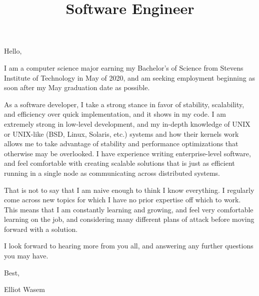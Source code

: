 \documentclass[12pt,letterpaper,roman]{moderncv}
\title{Software Engineer}
\begin{document}
\maketitle{}

\sethintscolumntowidth{\ }
Hello,\bigskip

I am a computer science major earning my Bachelor's of Science from Stevens Institute of Technology in May of 2020, and am seeking employment beginning as soon after my May graduation date as possible.\bigskip

As a software developer, I take a strong stance in favor of stability, scalability, and efficiency over quick implementation, and it shows in my code. I am extremely strong in low-level development, and my in-depth knowledge of UNIX or UNIX-like (BSD, Linux, Solaris, etc.) systems and how their kernels work allows me to take advantage of stability and performance optimizations that otherwise may be overlooked. I have experience writing enterprise-level software, and feel comfortable with creating scalable solutions that is just as efficient running in a single node as communicating across distributed systems.\bigskip

That is not to say that I am naive enough to think I know everything. I regularly come across new topics for which I have no prior expertise off which to work. This means that I am constantly learning and growing, and feel very comfortable learning on the job, and considering many different plans of attack before moving forward with a solution.\bigskip

I look forward to hearing more from you all, and answering any further questions you may have.\bigskip

Best,

Elliot Wasem
\end{document}
